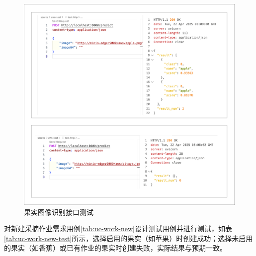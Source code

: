 \begin{figure}[H]
    \centering
    \includegraphics[width=0.9\linewidth]{../result/rest-produce-predict.png}
    \caption{果实图像识别接口测试}
    \label{fig:rest-produce-predict}
\end{figure}

对新建采摘作业需求用例\ref{tab:uc-work-new}设计测试用例并进行测试，如表\ref{tab:uc-work-new-test}所示，选择启用的果实（如苹果）时创建成功；选择未启用的果实（如香蕉）或已有作业的果实时创建失败，实际结果与预期一致。

